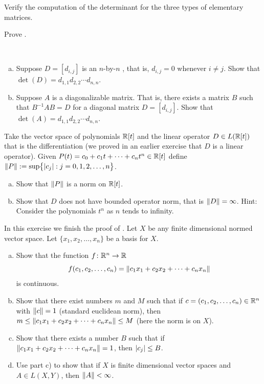 \begin{exercise}
Verify the computation of the determinant for the three types of 
elementary matrices.
\end{exercise}

\begin{exercise}
Prove .
\end{exercise}

\begin{exercise}
{\ }
\begin{enumerate}[a)]
\item
Suppose $D = [d_{i,j}]$ is an $n$-by-$n$ \emph{}, that is, $d_{i,j} = 0$ whenever $i
\not= j$.  Show that $\det(D) = d_{1,1}d_{2,2} \cdots d_{n,n}$.
\item
Suppose $A$ is a diagonalizable matrix.  That is, there exists a matrix
$B$ such that $B^{-1}AB = D$ for a diagonal matrix $D = [d_{i,j}]$.  Show
that $\det(A) = d_{1,1}d_{2,2} \cdots d_{n,n}$.
\end{enumerate}
\end{exercise}

\begin{exercise}
Take the vector space of polynomials ${\mathbb{R}}[t]$ and the linear operator $D \in
L({\mathbb{R}}[t])$ that is
the differentiation (we proved in an earlier exercise that $D$ is a linear
operator).  Given $P(t) = c_0 + c_1 t + \cdots + c_n
t^n \in {\mathbb{R}}[t]$ define $\lVert {P} \rVert := \sup \bigl\{ \lvert {c_j} \rvert : j = 0,1,2,\ldots,n \bigr\}$.
\begin{enumerate}[a)]
\item
Show that $\lVert {P} \rVert$ is a norm on ${\mathbb{R}}[t]$.
\item
Show that $D$ does not have bounded operator norm, that is $\lVert {D} \rVert =
\infty$.  Hint: Consider the polynomials $t^n$ as $n$ tends to infinity.
\end{enumerate}
\end{exercise}

\begin{exercise}
In this exercise we finish the proof of .
Let $X$ be any finite dimensional normed vector space.
Let $\{ x_1,x_2,\ldots,x_n \}$ be a basis for $X$.
\begin{enumerate}[a)]
\item
Show that the function $f \colon {\mathbb{R}}^n \to {\mathbb{R}}$
\begin{equation*}
f(c_1,c_2,\ldots,c_n) = 
\lVert {c_1 x_1 + c_2 x_2 + \cdots + c_n x_n} \rVert
\end{equation*}
is continuous.
\item
Show that there exist numbers $m$ and $M$ such
that if $c = (c_1,c_2,\ldots,c_n) \in {\mathbb{R}}^n$ with
$\lVert {c} \rVert = 1$ (standard euclidean norm), then 
$m \leq \lVert {c_1 x_1 + c_2 x_2 + \cdots + c_n x_n} \rVert \leq M$ (here the
norm is on $X$).
\item
Show that there exists a number $B$ such that if
$\lVert {c_1 x_1 + c_2 x_2 + \cdots + c_n x_n} \rVert=1$,
then $\lvert {c_j} \rvert \leq B$.
\item
Use part c) to show that if $X$ is finite dimensional vector 
spaces and $A \in L(X,Y)$, then $\lVert {A} \rVert < \infty$.
\end{enumerate}
\end{exercise}

